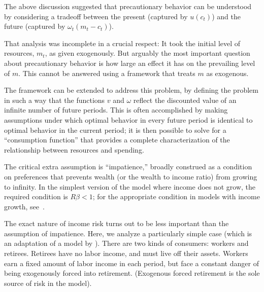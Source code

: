 
The above discussion suggested that precautionary behavior can be understood by considering a tradeoff between
the present (captured by $u(c_{t})$) and the future (captured by ${\omega}_{t}({m}_{t}-{c}_{t})$).

That analysis was incomplete in a crucial respect: It took the initial
level of resources, ${m}_{t}$, as given exogenously.  But arguably the
most important question about precautionary behavior is how large an
effect it has on the prevailing level of ${m}$. This cannot be
answered using a framework that treats ${m}$ as exogenous.

The framework can be extended to address this problem, by defining the
problem in such a way that the functions $v$ and ${\omega}$ reflect
the discounted value of an infinite number of future periods.  This is
often accomplished by making assumptions under which optimal behavior
in every future period is identical to optimal behavior in the current
period; it is then possible to solve for a ``consumption function''
that provides a complete characterization of the relationship between
resources and spending.

The critical extra assumption is ``impatience,'' broadly construed as a condition
on preferences that prevents wealth (or the wealth to income ratio) from growing to infinity.  In the simplest version
of the model where income does not grow, the required condition is
$R\beta < 1$; for the appropriate condition in models with income growth,
see~\cite{BufferStockTheory}.

The exact nature of income risk turns out to be less important than
the assumption of impatience.  Here, we analyze a particularly simple
case (which is an adaptation of a model by \cite{toche:urisk}).  There
are two kinds of consumers: workers and retirees.  Retirees have no
labor income, and must live off their assets.  Workers earn a fixed
amount of labor income in each period, but face a constant danger of
being exogenously forced into retirement. (Exogenous forced retirement
is the sole source of risk in the model).

